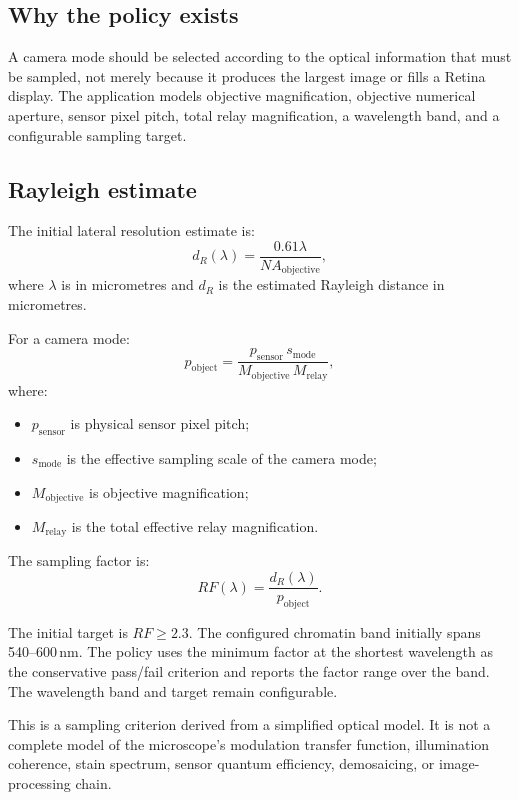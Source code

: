 \documentclass[11pt,a4paper,oneside]{article}
\begin{document}
\subsection{Why the policy exists}
A camera mode should be selected according to the optical information that must be sampled, not merely because it produces the largest image or fills a Retina display. The application models objective magnification, objective numerical aperture, sensor pixel pitch, total relay magnification, a wavelength band, and a configurable sampling target.

\subsection{Rayleigh estimate}
The initial lateral resolution estimate is:
\begin{equation}
d_R(\lambda) = \frac{0.61\lambda}{NA_{\mathrm{objective}}},
\end{equation}
where $\lambda$ is in micrometres and $d_R$ is the estimated Rayleigh distance in micrometres.

For a camera mode:
\begin{equation}
p_{\mathrm{object}} =
\frac{p_{\mathrm{sensor}}\,s_{\mathrm{mode}}}
{M_{\mathrm{objective}}\,M_{\mathrm{relay}}},
\end{equation}
where:
\begin{itemize}
  \item $p_{\mathrm{sensor}}$ is physical sensor pixel pitch;
  \item $s_{\mathrm{mode}}$ is the effective sampling scale of the camera mode;
  \item $M_{\mathrm{objective}}$ is objective magnification;
  \item $M_{\mathrm{relay}}$ is the total effective relay magnification.
\end{itemize}

The sampling factor is:
\begin{equation}
RF(\lambda) = \frac{d_R(\lambda)}{p_{\mathrm{object}}}.
\end{equation}

The initial target is $RF\geq 2.3$. The configured chromatin band initially spans 540--600\,nm. The policy uses the minimum factor at the shortest wavelength as the conservative pass/fail criterion and reports the factor range over the band. The wavelength band and target remain configurable.

This is a sampling criterion derived from a simplified optical model. It is not a complete model of the microscope's modulation transfer function, illumination coherence, stain spectrum, sensor quantum efficiency, demosaicing, or image-processing chain.
\end{document}
